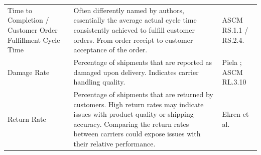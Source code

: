 \documentclass{imc-inf}
\begin{document}
\begin{table}[!htbp]
\begin{tabular}{@{}>{\raggedright\arraybackslash}p{4cm}p{8cm}>{\raggedright\arraybackslash}p{3cm}@{}}
    Time to Completion / Customer Order Fulfillment Cycle Time                                                                                                                                                                                                                          &
    Often differently named by authors, essentially the average actual cycle time consistently achieved to fulfill customer orders. From order receipt to customer acceptance of the order.                                                                                             &
    ASCM RS.1.1 / RS.2.4. \cite{ascm2022scor}                                                                                                                                                                                                                                                                                    \\[6pt]

    Damage Rate                                                                                                                                                                                                                                                                         &
    Percentage of shipments that are reported as damaged upon delivery. Indicates carrier handling quality.                                                                                                                                                                             &
    Piela \cite{caiImprovingSupplyChain2009}; ASCM RL.3.10 \cite{ascm2022scor}                                                                                                                                                                                                                                                   \\[6pt]

    Return Rate                                                                                                                                                                                                                                                                         &
    Percentage of shipments that are returned by customers. High return rates may indicate issues with product quality or shipping accuracy. Comparing the return rates between carriers could expose issues with their relative performance.                                           &
    Ekren et al. \cite{ekrenEnhancingEgroceryOrder2025}                                                                                                                                                                                                                                                                          \\[6pt]


\end{tabular}
\end{table}
\end{document}
